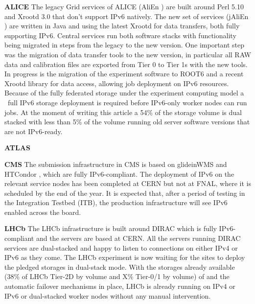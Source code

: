 \textbf{ALICE}
The legacy Grid services of ALICE (AliEn \cite{alien}) are built around Perl 5.10 and Xrootd 3.0 that don’t support IPv6 natively. The new set of services (jAliEn \cite{jalien}) are written in Java and using the latest Xrootd for data transfers, both fully supporting IPv6. Central services run both software stacks with functionality being migrated in steps from the legacy to the new version. One important step was the migration of data transfer tools to the new version, in particular all RAW data and calibration files are exported from Tier 0 to Tier 1s with the new tools. In progress is the migration of the experiment software to ROOT6 and a recent Xrootd library for data access, allowing job deployment on IPv6 resources.
Because of the fully federated storage under the experiment computing model a ~full IPv6 storage deployment is required before IPv6-only worker nodes can run jobs. At the moment of writing this article a 54\% of the storage volume is dual stacked with less than 5\% of the volume running old server software versions that are not IPv6-ready.

\textbf{ATLAS}


\textbf{CMS}
The submission infrastructure in CMS is based on glideinWMS \cite{glideinwms} and HTCondor \cite{htcondor}, which are fully IPv6-compliant. The deployment of IPv6 on the relevant service nodes has been completed at CERN but not at FNAL, where it is scheduled by the end of the year. It is expected that, after a period of testing in the Integration Testbed (ITB), the production infrastructure will see IPv6 enabled across the board.

\textbf{LHCb}
The LHCb infrastructure is built around DIRAC \cite{dirac} which is fully IPv6-compliant and the servers are based at CERN. All the servers running DIRAC services are dual-stacked and happy to listen to connections on either IPv4 or IPv6 as they come. The LHCb experiment is now waiting for the sites to deploy the pledged storages in dual-stack mode. With the storages already available (38\% of LHCb Tier-2D by volume and X\% Tier-0/1 by volume) of  and the automatic failover mechanisms in place, LHCb is already running on IPv4 or IPv6 or dual-stacked worker nodes without any manual intervention.
